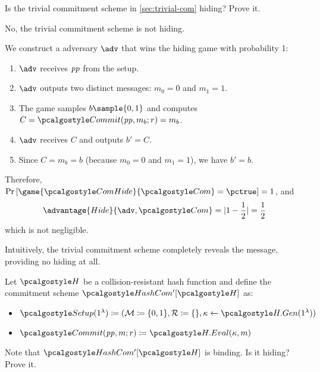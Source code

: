 \begin{exercise}
  Is the trivial commitment scheme in \cref{sec:trivial-com} hiding?
  Prove it.
\end{exercise}

\ifsolutions
\begin{mysolution}
  No, the trivial commitment scheme is not hiding.

  We construct a \ppt adversary $\adv$ that wins the hiding game with probability 1:

  \begin{enumerate}
    \item $\adv$ receives $\mathit{pp}$ from the setup.
    \item $\adv$ outputs two distinct messages: $m_0 = 0$ and $m_1 = 1$.
    \item The game samples $b \sample \{0, 1\}$ and computes $C = \algo{Commit}(\params, m_b; r) = m_b$.
    \item $\adv$ receives $C$ and outputs $b' = C$.
    \item Since $C = m_b = b$ (because $m_0 = 0$ and $m_1 = 1$), we have $b' = b$.
  \end{enumerate}

  Therefore, $\pr{\game{\algo{ComHide}}{\algo{Com}} = \pctrue} = 1$, and 
  \[
    \advantage{Hide}{\adv, \algo{Com}} = |1 - \frac{1}{2}| = \frac{1}{2}
  \]
  which is not negligible.

  Intuitively, the trivial commitment scheme completely reveals the message, providing no hiding at all.
\end{mysolution}
\fi

\begin{exercise}
  Let $\algo{H}$ be a collision-resistant hash function and define the commitment scheme $\algo{HashCom'}[\algo{H}]$ as:
  \begin{itemize}
    \item $\algo{Setup}(1^\lambda) \defeq (\mathcal{M} \defeq \{0, 1\}, \mathcal{R} \defeq \{\}, \kappa \gets \algo{H.Gen}(1^\lambda))$
    \item $\algo{Commit}(\params,m;r) \defeq  \algo{H.Eval}(\kappa, m)$
  \end{itemize}
  Note that $\algo{HashCom'}[\algo{H}]$ is binding.
  Is it hiding?
  Prove it.
\end{exercise}

